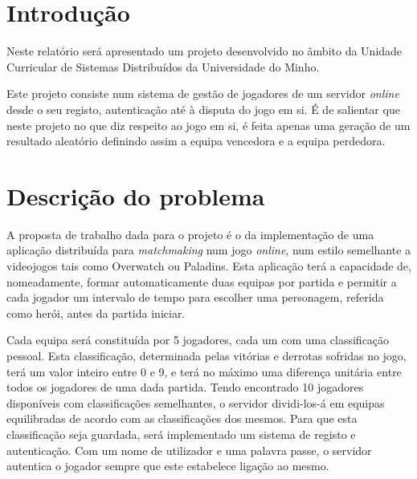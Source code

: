 \documentclass[a4paper]{article}
\begin{document}
\begin{abstract}

\hspace{3mm} 

\end{abstract}

\pagebreak
\tableofcontents

\pagebreak
\section{Introdução}
\label{sec:1}

\hspace{3mm} Neste relatório será apresentado um projeto desenvolvido no âmbito da Unidade Curricular de Sistemas Distribuídos da Universidade do Minho.

\par Este projeto consiste num sistema de gestão de jogadores de um servidor \emph{online} desde o seu registo, autenticação até à disputa do jogo em si. É de salientar que neste projeto no que diz respeito ao jogo em si, é feita apenas uma geração de um resultado aleatório definindo assim a equipa vencedora e a equipa perdedora.




\pagebreak
\section{Descrição do problema}
\label{sec:2}

\hspace{3mm} A proposta de trabalho dada para o projeto é o da implementação de uma aplicação distribuída para \textit{matchmaking} num jogo \textit{online}, num estilo semelhante a videojogos tais como Overwatch ou Paladins. Esta aplicação terá a capacidade de, nomeadamente, formar automaticamente duas equipas por partida e permitir a cada jogador um intervalo de tempo para escolher uma personagem, referida como herói, antes da partida iniciar.

\par Cada equipa será constituída por 5 jogadores, cada um com uma classificação pessoal. Esta classificação, determinada pelas vitórias e derrotas sofridas no jogo, terá um valor inteiro entre 0 e 9, e terá no máximo uma diferença unitária entre todos os jogadores de uma dada partida. Tendo encontrado 10 jogadores disponíveis com classificações semelhantes, o servidor dividi-los-á em equipas equilibradas de acordo com as classificações dos mesmos. Para que esta classificação seja guardada, será implementado um sistema de registo e autenticação. Com um nome de utilizador e uma palavra passe, o servidor autentica o jogador sempre que este estabelece ligação ao mesmo.
\end{document}
